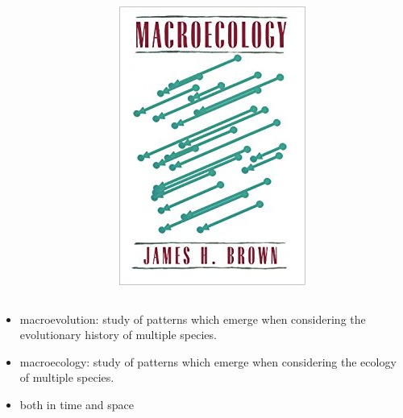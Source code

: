 \documentclass{beamer}
\begin{document}
\begin{frame}
\begin{columns}
\begin{column}{0.5\textwidth}
\begin{center}
      \end{center}
    \end{column}
    \begin{column}{0.5\textwidth}
      \begin{center}
        \includegraphics[height=0.8\textheight,width=\textwidth,keepaspectratio=true]{figure/brown_macro}
      \end{center}
    \end{column}
  \end{columns}
\end{frame}

\begin{frame}
  \begin{definition}
    \begin{itemize}
      \item \alert{macroevolution}: study of patterns which emerge when considering the evolutionary history of multiple species.
      \item \alert{macroecology}: study of patterns which emerge when considering the ecology of multiple species.
      \item both in time and space
    \end{itemize}
  \end{definition}
\end{frame}
\end{document}
